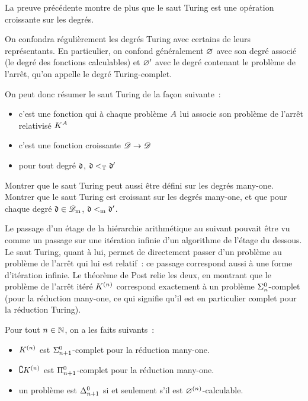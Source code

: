 \begin{corollary}
  La preuve précédente montre de plus que le saut Turing est une opération
  croissante sur les degrés.
\end{corollary}

\begin{notation}
  On confondra régulièrement les degrés Turing avec certains de leurs
  représentants. En particulier, on confond généralement $\varnothing$ avec son
  degré associé (le degré des fonctions calculables) et $\varnothing'$ avec le degré
  contenant le problème de l'arrêt, qu'on appelle le degré Turing-complet.
\end{notation}

On peut donc résumer le saut Turing de la façon suivante~:
\begin{itemize}
\item c'est une fonction qui à chaque problème $A$ lui associe son problème
  de l'arrêt relativisé $K^{A}$
\item c'est une fonction croissante $\mathscr{D} \to \mathscr{D}$
\item pour tout degré $\mathfrak{d}$, $\mathfrak{d} <_{\mathrm{T}} \mathfrak{d}'$
\end{itemize}

\begin{exercise}
  Montrer que le saut Turing peut aussi être défini sur les degrés many-one.
  Montrer que le saut Turing est croissant sur les degrés many-one, et que
  pour chaque degré $\mathfrak{d} \in \mathscr{D}_{\mathrm{m}}$, $\mathfrak{d}<_{\mathrm{m}} \mathfrak{d}'$.
\end{exercise}

Le passage d'un étage de la hiérarchie arithmétique au suivant pouvait être vu
comme un passage sur une itération infinie d'un algorithme de l'étage du
dessous. Le saut Turing, quant à lui, permet de directement passer d'un problème
au problème de l'arrêt qui lui est relatif~: ce passage correspond aussi à une
forme d'itération infinie. Le théorème de Post relie les deux, en montrant que
le problème de l'arrêt itéré $K^{(n)}$ correspond exactement à un problème
$\Sigma^0_{n}$-complet (pour la réduction many-one, ce qui signifie qu'il est
en particulier complet pour la réduction Turing).

\begin{theorem}[Post]\label{thm.Post}
  Pour tout $n \in \mathbb N$, on a les faits suivants~:
  \begin{itemize}
  \item $K^{(n)}$ est $\Sigma^0_{n+1}$-complet pour la réduction many-one.
  \item $\complement K^{(n)}$ est $\Pi^0_{n+1}$-complet pour la
    réduction many-one.
  \item un problème est $\Delta^0_{n+1}$ si et seulement s'il est
    $\varnothing^{(n)}$-calculable.
  \end{itemize}
\end{theorem}

